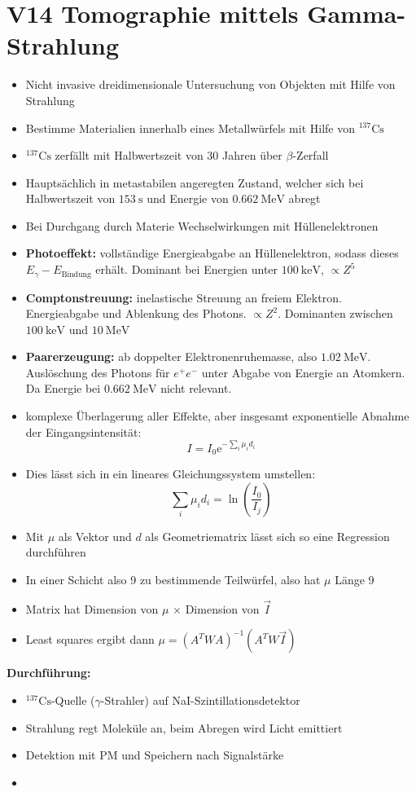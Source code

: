 \section{V14 Tomographie mittels Gamma-Strahlung}
\label{sec:V14}

\begin{itemize}
    \item Nicht invasive dreidimensionale Untersuchung von Objekten mit Hilfe von Strahlung
    \item Bestimme Materialien innerhalb eines Metallwürfels mit Hilfe von $^{137}\text{Cs}$
    \item $^{137}\text{Cs}$ zerfällt mit Halbwertszeit von 30 Jahren über $\beta$-Zerfall
    \item Hauptsächlich in metastabilen angeregten Zustand, welcher sich bei Halbwertszeit von $\SI{153}{\second}$ und Energie von $\SI{0,662}{\mega\electronvolt}$ abregt
    \item Bei Durchgang durch Materie Wechselwirkungen mit Hüllenelektronen
    \item \textbf{Photoeffekt:} vollständige Energieabgabe an Hüllenelektron, sodass dieses $E_\gamma - E_\text{Bindung}$ erhält. Dominant bei Energien unter $\SI{100}{\kilo\electronvolt}$, $\propto Z^5$
    \item \textbf{Comptonstreuung:} inelastische Streuung an freiem Elektron. Energieabgabe und Ablenkung des Photons. $\propto Z^2$. Dominanten zwischen $\SI{100}{\kilo\electronvolt}$ und $\SI{10}{\mega\electronvolt}$
    \item \textbf{Paarerzeugung:} ab doppelter Elektronenruhemasse, also $\SI{1,02}{\mega\electronvolt}$. Auslöschung des Photons für $e^+e^-$ unter Abgabe von Energie an Atomkern. Da Energie bei $\SI{0.662}{\mega\electronvolt}$ nicht relevant.
    \item komplexe Überlagerung aller Effekte, aber insgesamt exponentielle Abnahme der Eingangsintensität:
        \begin{equation}
            I = I_0\text{e}^{-\sum\limits_{i}\mu_id_i}
        \end{equation}
    \item Dies lässt sich in ein lineares Gleichungssystem umstellen:
        \begin{equation}
            \sum\limits_{i}\mu_id_i = \ln\left(\frac{I_0}{I_j}\right)
        \end{equation}
    \item Mit $\mu$ als Vektor und $d$ als Geometriematrix lässt sich so eine Regression durchführen
    \item In einer Schicht also 9 zu bestimmende Teilwürfel, also hat $\mu$ Länge 9
    \item Matrix hat Dimension von $\mu$ $\times$ Dimension von $\vec{I}$
    \item Least squares ergibt dann $\mu = (A^TWA)^{-1}(A^TW\vec{I})$
\end{itemize}

\textbf{Durchführung:}
\begin{itemize}
    \item $^137\text{Cs}$-Quelle ($\gamma$-Strahler) auf NaI-Szintillationsdetektor
    \item Strahlung regt Moleküle an, beim Abregen wird Licht emittiert
    \item Detektion mit PM und Speichern nach Signalstärke
    \item 
\end{itemize}
